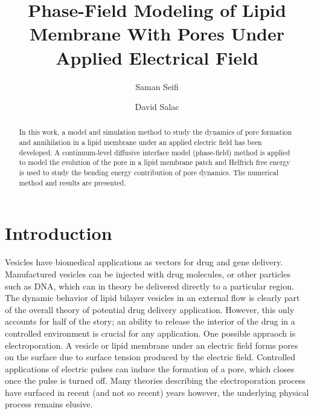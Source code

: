 \documentclass[english,12pt]{article}
\begin{document}
\title{Phase-Field Modeling of Lipid Membrane With Pores Under Applied Electrical Field}

\author{Saman Seifi}
\author{David Salac}

\date{}

\maketitle

\begin{abstract}
In this work, a model and simulation method to study the dynamics of pore formation and annihilation in a lipid membrane under an applied electric field has been developed. A continuum-level diffusive interface model (phase-field) method is applied to model the evolution of the pore in a lipid membrane patch and Helfrich free energy is used to study the bending energy contribution of pore dynamics. The numerical method and results are presented.	
\end{abstract}


\section{Introduction}

Vesicles have biomedical applications as vectors for drug and gene delivery. Manufactured vesicles can be injected with drug molecules, or other particles such as DNA, which can in theory be delivered directly to a particular region.
    The dynamic behavior of lipid bilayer vesicles in an external flow is clearly part of the overall theory of potential drug delivery application.
However, this only accounts for half of the story; an ability to release the interior
of the drug in a controlled environment is crucial for any application. 
     One possible appraoch is electroporation. A vesicle or lipid membrane under an electric field forms pores on the surface due to surface tension produced by the electric field. Controlled applications of electric pulses can induce the formation of a pore, which closes once the pulse is turned off.
     Many theories describing the electroporation process have surfaced in recent (and not so recent) years \citep{Weaver1996135,Zimmermann1974881,DeBruin19991213} however, the underlying physical process remains elusive.
     
\end{document}
